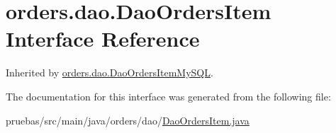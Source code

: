 \hypertarget{interfaceorders_1_1dao_1_1_dao_orders_item}{}\section{orders.\+dao.\+Dao\+Orders\+Item Interface Reference}
\label{interfaceorders_1_1dao_1_1_dao_orders_item}


Inherited by \mbox{\hyperlink{classorders_1_1dao_1_1_dao_orders_item_my_s_q_l}{orders.\+dao.\+Dao\+Orders\+Item\+My\+S\+QL}}.



The documentation for this interface was generated from the following file\+:\begin{DoxyCompactItemize}
\item 
pruebas/src/main/java/orders/dao/\mbox{\hyperlink{_dao_orders_item_8java}{Dao\+Orders\+Item.\+java}}\end{DoxyCompactItemize}
